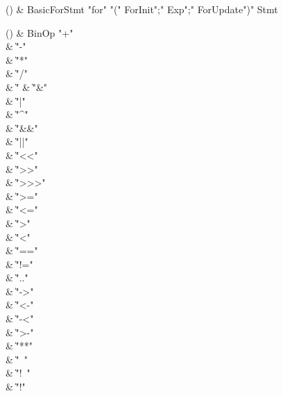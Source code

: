 \begin{bbgrammarappendix}

() & BasicForStmt \label{prod:BasicForStmt}  \: \xcd"for" \xcd"(" ForInit\opt \xcd";" Exp\opt \xcd";" ForUpdate\opt \xcd")" Stmt  \\


\end{bbgrammarappendix}

\begin{bbgrammarappendix}

() & BinOp \label{prod:BinOp}  \: \xcd"+"  \\

 &    \| \xcd"-" \\
 &    \| \xcd"*" \\
 &    \| \xcd"/" \\
 &    \| \xcd"%
 &    \| \xcd"&" \\
 &    \| \xcd"|" \\
 &    \| \xcd"^" \\
 &    \| \xcd"&&" \\
 &    \| \xcd"||" \\
 &    \| \xcd"<<" \\
 &    \| \xcd">>" \\
 &    \| \xcd">>>" \\
 &    \| \xcd">=" \\
 &    \| \xcd"<=" \\
 &    \| \xcd">" \\
 &    \| \xcd"<" \\
 &    \| \xcd"==" \\
 &    \| \xcd"!=" \\
 &    \| \xcd".." \\
 &    \| \xcd"->" \\
 &    \| \xcd"<-" \\
 &    \| \xcd"-<" \\
 &    \| \xcd">-" \\
 &    \| \xcd"**" \\
 &    \| \xcd"~" \\
 &    \| \xcd"!~" \\
 &    \| \xcd"!" \\

\end{bbgrammarappendix}

